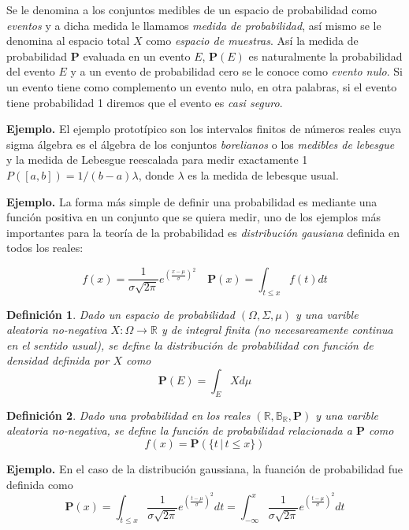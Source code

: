 \documentclass[letterpaper]{article}
\newtheorem{def.}{Definici\'on}[section]
\newcommand{\prob}{\textbf{P}}
\newcommand{\eje}{{\newline \noindent \sc \textbf{Ejemplo. }}}
\newcommand{\om}{\ensuremath{\Omega}}
\newcommand{\sig}{\ensuremath{\Sigma}}
\newcommand{\re}{\ensuremath{\mathbb R }}
\begin{document}
Se le denomina a los conjuntos medibles de un espacio de probabilidad como \emph{eventos} y a dicha medida le llamamos \emph{medida de probabilidad}, así mismo se le denomina al espacio total \(X\) como \emph{espacio de muestras}. Así la medida de probabilidad \textbf{P} evaluada en un evento \(E\), \(\textbf{P}(E)\) es naturalmente la probabilidad del evento \(E\) y a un evento de probabilidad cero se le conoce como \emph{evento nulo}. Si un evento tiene como complemento un evento nulo, en otra palabras, si el evento tiene probabilidad 1 diremos que el evento es \emph{casi seguro}.

\eje El ejemplo prototípico son los intervalos finitos de números reales cuya sigma álgebra es el álgebra de los conjuntos \emph{borelianos} o los \emph{medibles de lebesgue} y la medida de Lebesgue reescalada para medir exactamente 1 \(P([a,b])=1/(b-a)\lambda\), donde \(\lambda\) es la medida de lebesque usual.

\eje La forma más simple de definir una probabilidad es mediante una función positiva en un conjunto que se quiera medir, uno de los ejemplos más importantes para la teoría de la probabilidad es \emph{distribución gausiana} definida en todos los reales:

\[
    f(x)=\frac{1}{\sigma\sqrt{2\pi}}e^{(\frac{x-\mu}{\sigma})^2}\quad \prob(x)=\int_{t\leq x}f(t)dt
\]

\begin{def.}
Dado un espacio de probabilidad \((\om,\sig,\mu)\) y una varible aleatoria no-negativa \(X:\om\rightarrow \re\) y de integral finita (no necesareamente continua en el sentido usual), se define la \emph{distribución de probabilidad} con función de densidad definida por \(X\) como
\[
\prob(E)=\int_E Xd\mu
\]
\end{def.}

\begin{def.}
Dado una probabilidad en los reales \((\re,\mathbb{B}_{\re},\prob)\) y una varible aleatoria no-negativa, se define la \emph{función de probabilidad} relacionada a \(\prob\) como
\[
        f(x)=\prob(\{t\,|\,t\leq x\})
\]
\end{def.}
\eje En el caso de la distribución gaussiana, la fuanción de probabilidad fue definida como
\[
    \prob(x)=\int_{t\leq x}\frac{1}{\sigma\sqrt{2\pi}}e^{(\frac{t-\mu}{\sigma})^2}dt =
    \int_{-\infty}^{x}\frac{1}{\sigma\sqrt{2\pi}}e^{(\frac{t-\mu}{\sigma})^2}dt
\]
\end{document}
